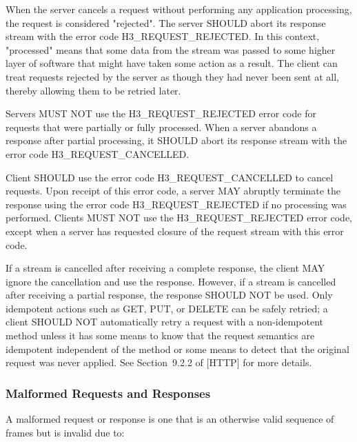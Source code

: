 \documentclass{article}
\begin{document}
When the server cancels a request without performing any application processing, the request is considered "rejected".  The server SHOULD abort its response stream with the error code H3\_REQUEST\_REJECTED. In this context, "processed" means that some data from the stream was passed to some higher layer of software that might have taken some action as a result.  The client can treat requests rejected by the server as though they had never been sent at all, thereby allowing them to be retried later.

Servers MUST NOT use the H3\_REQUEST\_REJECTED error code for requests that were partially or fully processed.  When a server abandons a response after partial processing, it SHOULD abort its response stream with the error code H3\_REQUEST\_CANCELLED.

Client SHOULD use the error code H3\_REQUEST\_CANCELLED to cancel requests.  Upon receipt of this error code, a server MAY abruptly terminate the response using the error code H3\_REQUEST\_REJECTED if no processing was performed.  Clients MUST NOT use the H3\_REQUEST\_REJECTED error code, except when a server has requested closure of the request stream with this error code.

If a stream is cancelled after receiving a complete response, the client MAY ignore the cancellation and use the response.  However, if a stream is cancelled after receiving a partial response, the response SHOULD NOT be used.  Only idempotent actions such as GET, PUT, or DELETE can be safely retried; a client SHOULD NOT automatically retry a request with a non-idempotent method unless it has some means to know that the request semantics are idempotent independent of the method or some means to detect that the original request was never applied.  See Section~9.2.2 of [HTTP] for more details.

\subsubsection{Malformed Requests and Responses}

A malformed request or response is one that is an otherwise valid sequence of frames but is invalid due to:
\end{document}
